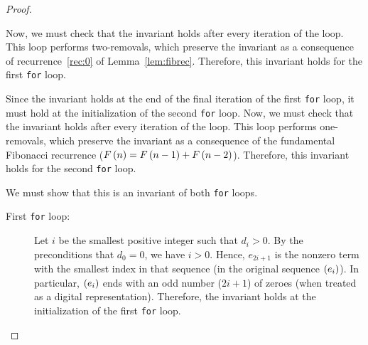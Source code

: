 \documentclass[english,12pt]{article}
\newcommand{\seq}{\p}
\begin{document}
\begin{proof}
\begin{description}
\begin{description}
Now, we must check that the invariant holds after every iteration of the loop.  This loop performs two-removals, which preserve the invariant as a consequence of recurrence~\ref{rec:0} of Lemma~\ref{lem:fibrec}.  Therefore, this invariant holds for the first \texttt{for} loop.
\item[Second \texttt{for} loop:] Since the invariant holds at the end of the final iteration of the first \texttt{for} loop, it must hold at the initialization of the second \texttt{for} loop.  Now, we must check that the invariant holds after every iteration of the loop.  This loop performs one-removals, which preserve the invariant as a consequence of the fundamental Fibonacci recurrence ($F\left(n\right)=F\left(n-1\right)+F\left(n-2\right)$).  Therefore, this invariant holds for the second \texttt{for} loop.
\end{description}
\item[Invariant 2: $\seq{e_i}$ ends with an odd number of zeroes:] We must show that this is an invariant of both \texttt{for} loops.
\begin{description}
\item[First \texttt{for} loop:] Let $i$ be the smallest positive integer such that $d_i>0$.  By the preconditions that $d_0=0$, we have $i>0$.  Hence, $e_{2i+1}$ is the nonzero term with the smallest index in that sequence (in the original sequence $\seq{e_i}$).  In particular, $\seq{e_i}$ ends with an odd number ($2i+1$) of zeroes (when treated as a digital representation).  Therefore, the invariant holds at the initialization of the first \texttt{for} loop.


\end{description}
\end{description}
\end{proof}
\end{document}
